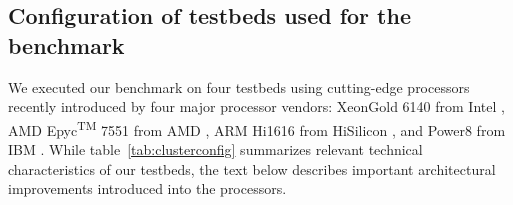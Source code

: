 \subsection{Configuration of testbeds used for the benchmark}
\label{sec:arch}
           
We executed our benchmark on four testbeds using cutting-edge processors recently introduced by four major processor vendors:
Xeon\textregistered Gold 6140 from Intel \cite{INTELXEONGOLD6140},
AMD Epyc\textsuperscript{TM} 7551 from AMD \cite{2019:epyc, now:epyc},
ARM Hi1616 from HiSilicon \cite{2017:hi1616,2019:hi1616},
and Power8 from IBM \cite{2015:power8,2016:power8}.
While
table~\ref{tab:clusterconfig} summarizes relevant technical characteristics of our testbeds,
the text below describes important architectural improvements introduced into the processors.


